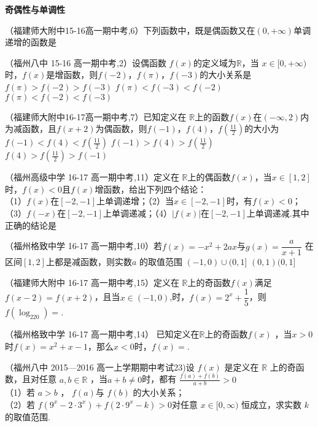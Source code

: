 \begin{exercise}{\bf 奇偶性与单调性}
\item
（福建师大附中15-16高一期中考,6）下列函数中，既是偶函数又在$(0,+\infty)$单调递增的函数是\xz
{}
\item
（福州八中 15-16 高一期中考,2）设偶函数 $f(x)$的定义域为$\mathbb{R}$，当 $x\in[0,+\infty)$时，$f(x)$是增函数，则$f(-2)$，$f(\pi)$，$f(-3)$的大小关系是\xz
{}
    {$f(\pi)>f(-2)>f(-3)$}
    {$f(\pi)<f(-3)<f(-2)$}
    {$f(\pi)<f(-2)<f(-3)$}
\item
（福建师大附中16-17高一期中考,7）已知定义在 $\mathbb{R}$上的函数$f(x)$在$(-\infty,2)$内为减函数，且$f(x+2)$为偶函数，则$f(-1)$，$f(4)$，$f(\frac{11}2)$的大小为\xz
{}
    {$f(-1)<f(4)<f(\frac{11}2)$}
    {$f(-1)>f(4)>f(\frac{11}2)$}
    {$f(4)>f(\frac{11}2)>f(-1)$}
\item
（福州高级中学 16-17 高一期中考,11）定义在 $\mathbb{R}$上的偶函数$f(x)$，当$x\in[1,2]$时，$f(x)<0$且$f(x)$增函数，给出下列四个结论：\\
（1）$f(x)$在$[-2,-1]$上单调递增；\hspace{4em}（2）当$x\in[-2,-1]$时，有$f(x)<0$；\\
（3）$f(-x)$在$[-2,-1]$上单调递减；\hspace{4em}（4）$|f(x)|$在$[-2,-1]$上单调递减.其中正确的结论是\xz
{}
\item
（福州格致中学 16-17 高一期中考,10）若$f(x)=-x^2+2ax$与$g(x)=\dfrac a{x+1}$ 在区间$[1,2]$上都是减函数，则实数$a$ 的取值范围\xz
{}
    {$(-1,0)\cup(0,1]$}
    {$(0,1)$}{$(0,1]$}
\item
（福建师大附中 16-17 高一期中考,15）定义在 $\mathbb{R}$上的奇函数$f(x)$满足 $f(x-2)=f(x+2)$，且当$x\in(-1,0)$,时，$f(x)=2^x+\dfrac15$，则$f(\log_220)=$\tk.\\
\item
（福州格致中学 16-17 高一期中考,14） 已知定义在$\mathbb{R}$上的奇函数$f(x)$ ，当$x>0$时$f(x)=x^2+x-1$，那么$x<0$时，$f(x)=$\tk.\\
\item
（福州八中 2015—2016 高一上学期期中考试23)设 $f (x )$ 是定义在 $\mathbb{R}$ 上的奇函数，且对任意 $a,b\in \mathbb{R}$ ，当$a+b\neq0$时，都有 $\frac{f(a)+f(b)}{a+b}>0$\\
（1）若 $a> b$ ， $f (a ) $与 $f (b)$ 的大小关系；\\
（2）若 $f (9^x- 2\cdot 3^x )+ f ( 2\cdot 9^x-k )> 0 $对任意 $x\in[0,\infty )$ 恒成立，求实数 $k$ 的取值范围.\\

\end{exercise}
